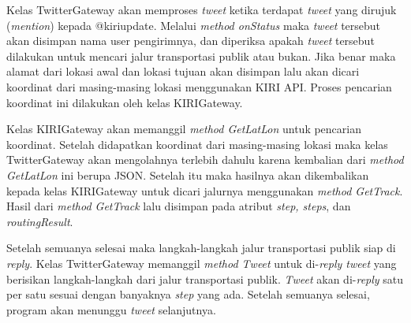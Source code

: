Kelas TwitterGateway akan memproses \textit{tweet} ketika terdapat \textit{tweet} yang dirujuk (\textit{mention}) kepada @kiriupdate. Melalui \textit{method onStatus} maka \textit{tweet} tersebut akan disimpan nama user pengirimnya, dan diperiksa apakah \textit{tweet} tersebut dilakukan untuk mencari jalur transportasi publik atau bukan. Jika benar maka alamat dari lokasi awal dan lokasi tujuan akan disimpan lalu akan dicari koordinat dari masing-masing lokasi menggunakan KIRI API. Proses pencarian koordinat ini dilakukan oleh kelas KIRIGateway.

Kelas KIRIGateway akan memanggil \textit{method GetLatLon} untuk pencarian koordinat. Setelah didapatkan koordinat dari masing-masing lokasi maka kelas TwitterGateway akan mengolahnya terlebih dahulu karena kembalian dari \textit{method GetLatLon} ini berupa JSON. Setelah itu maka hasilnya akan dikembalikan kepada kelas KIRIGateway untuk dicari jalurnya menggunakan \textit{method GetTrack}. Hasil dari \textit{method GetTrack} lalu disimpan pada atribut \textit{step, steps}, dan \textit{routingResult}.

Setelah semuanya selesai maka langkah-langkah jalur transportasi publik siap di \textit{reply}. Kelas TwitterGateway memanggil \textit{method Tweet} untuk di-\textit{reply tweet} yang berisikan langkah-langkah dari jalur transportasi publik. \textit{Tweet} akan di-\textit{reply} satu per satu sesuai dengan banyaknya \textit{step} yang ada. Setelah semuanya selesai, program akan menunggu \textit{tweet} selanjutnya.
